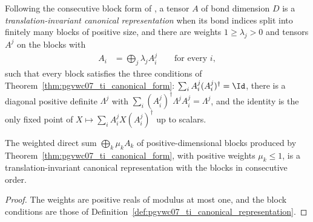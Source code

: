 \begin{definition}
    \label{def:pgvwc07_ti_canonical_representation}
    \leanok
    Following the consecutive block form of \cite[Theorem~4]{PerezGarcia2007Matrix},
    a tensor $A$ of bond dimension $D$ is a \emph{translation-invariant
        canonical representation} when its bond indices split into finitely
    many blocks of positive size, and there are weights $1\ge\lambda_j>0$ and
    tensors $A^j$ on the blocks with
    \begin{align}
        A_i & =\bigoplus_j\lambda_jA_i^j \qquad\text{for every }i,
        \label{eq:pgvwc07_ti_canonical_representation_block_form}
    \end{align}
    such that every block satisfies the three conditions of
    Theorem~\ref{thm:pgvwc07_ti_canonical_form}:
    $\sum_iA_i^j(A_i^j)^\dagger=\Id$, there is a diagonal positive definite
    $\Lambda^j$ with $\sum_i(A_i^j)^\dagger\Lambda^jA_i^j=\Lambda^j$, and
    the identity is the only fixed point of
    $X\mapsto\sum_iA_i^jX(A_i^j)^\dagger$ up to scalars.
\end{definition}

\begin{lemma}
    \label{lem:pgvwc07_ti_canonical_representation_of_blocks}
    \leanok
    The weighted direct sum $\bigoplus_k\mu_kA_k$ of positive-dimensional
    blocks produced by Theorem~\ref{thm:pgvwc07_ti_canonical_form}, with
    positive weights $\mu_k\le1$, is a translation-invariant canonical
    representation with the blocks in consecutive order.
\end{lemma}

\begin{proof}
    \leanok
    The weights are positive reals of modulus at most one, and the block
    conditions are those of Definition~\ref{def:pgvwc07_ti_canonical_representation}.
\end{proof}

